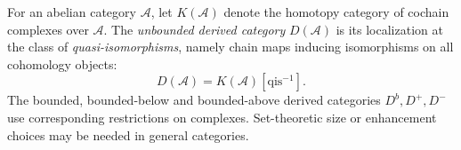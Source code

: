 
For an abelian category $\mathcal A$, let $K(\mathcal A)$ denote the homotopy category of cochain complexes over $\mathcal A$. The \emph{unbounded derived category} $D(\mathcal A)$ is its localization at the class of \emph{quasi-isomorphisms}, namely chain maps inducing isomorphisms on all cohomology objects:
\[
D(\mathcal A)=K(\mathcal A)[\mathrm{qis}^{-1}].
\]
The bounded, bounded-below and bounded-above derived categories $D^b,D^+,D^-$ use corresponding restrictions on complexes. Set-theoretic size or enhancement choices may be needed in general categories.
